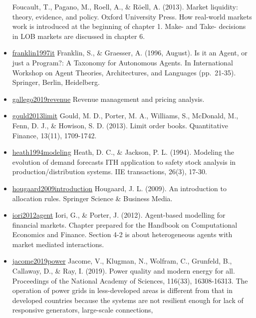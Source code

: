 \documentclass[letterpaper,8pt,twocolumn,twoside,]{pinp}
\begin{document}
\begin{itemize}
  Foucault, T., Pagano, M., Roell, A., \& Röell, A. (2013). Market
  liquidity: theory, evidence, and policy. Oxford University Press. How
  real-world markets work is introduced at the beginning of chapter 1.
  Make- and Take- decisions in LOB markets are discussed in chapter 6.
\item
  \href{https://link.springer.com/chapter/10.1007/BFb0013570}{franklin1997it}
  Franklin, S., \& Graesser, A. (1996, August). Is it an Agent, or just
  a Program?: A Taxonomy for Autonomous Agents. In International
  Workshop on Agent Theories, Architectures, and Languages (pp.~21-35).
  Springer, Berlin, Heidelberg.
\item
  \href{https://link.springer.com/book/10.1007/978-1-4939-9606-3}{gallego2019revenue}
  Revenue management and pricing analysis.
\item
  \href{https://www.tandfonline.com/doi/abs/10.1080/14697688.2013.803148}{gould2013limit}
  Gould, M. D., Porter, M. A., Williams, S., McDonald, M., Fenn, D. J.,
  \& Howison, S. D. (2013). Limit order books. Quantitative Finance,
  13(11), 1709-1742.
\item
  \href{https://www.tandfonline.com/doi/abs/10.1080/07408179408966604}{heath1994modeling}
  Heath, D. C., \& Jackson, P. L. (1994). Modeling the evolution of
  demand forecasts ITH application to safety stock analysis in
  production/distribution systems. IIE transactions, 26(3), 17-30.
\item
  \href{https://link.springer.com/book/10.1007/978-3-642-01828-2}{hougaard2009introduction}
  Hougaard, J. L. (2009). An introduction to allocation rules. Springer
  Science \& Business Media.
\item
  \href{https://www.oxfordhandbooks.com/view/10.1093/oxfordhb/9780199844371.001.0001/oxfordhb-9780199844371-e-43}{iori2012agent}
  Iori, G., \& Porter, J. (2012). Agent-based modelling for financial
  markets. Chapter prepared for the Handbook on Computational Economics
  and Finance. Section 4-2 is about heterogeneous agents with market
  mediated interactions.
\item
  \href{https://www.pnas.org/content/116/33/16308}{jacome2019power}
  Jacome, V., Klugman, N., Wolfram, C., Grunfeld, B., Callaway, D., \&
  Ray, I. (2019). Power quality and modern energy for all. Proceedings
  of the National Academy of Sciences, 116(33), 16308-16313. The
  operation of power grids in less-developed areas is different from
  that in developed countries because the systems are not resilient
  enough for lack of responsive generators, large-scale connections,

\end{itemize}
\end{document}

